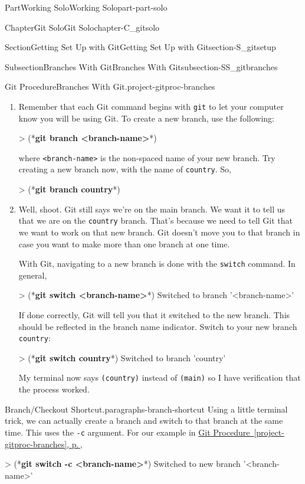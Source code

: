 \documentclass[twoside,10pt,]{book}
\newcommand{\xreffont}{\relax}
\newcommand{\mono}[1]{\texttt{#1}}
\newcommand{\consoleinput}[1]{\textbf{#1}}
\begin{document}
\begin{partptx}{Part}{Working Solo}{}{Working Solo}{}{}{part-part-solo}
\begin{chapterptx}{Chapter}{Git Solo}{}{Git Solo}{}{}{chapter-C_gitsolo}
\begin{sectionptx}{Section}{Getting Set Up with Git}{}{Getting Set Up with Git}{}{}{section-S_gitsetup}
\begin{subsectionptx}{Subsection}{Branches With Git}{}{Branches With Git}{}{}{subsection-SS_gitbranches}
\begin{project}{Git Procedure}{Branches With Git.}{project-gitproc-branches}
\begin{enumerate}[font=\bfseries,label=(\alph*),ref=\alph*]
\item{}Remember that each Git command begins with \mono{git} to let your computer know you will be using Git. To create a new branch, use the following:%
\begin{console}{0}{1}{0}
> (*\consoleinput{git branch <branch-name>}*)
\end{console}
where \mono{<branch-name>} is the non-spaced name of your new branch. Try creating a new branch now, with the name of \mono{country}. So,%
\begin{console}{0}{1}{0}
> (*\consoleinput{git branch country}*)
\end{console}
\item{}Well, shoot. Git still says we're on the main branch. We want it to tell us that we are on the \mono{country} branch. That's because we need to tell Git that we want to work on that new branch. Git doesn't move you to that branch in case you want to make more than one branch at one time.%
\par
With Git, navigating to a new branch is done with the \mono{switch} command. In general,%
\begin{console}{0}{1}{0}
> (*\consoleinput{git switch <branch-name>}*)
Switched to branch '<branch-name>'
\end{console}
If done correctly, Git will tell you that it switched to the new branch. This should be reflected in the branch name indicator. Switch to your new branch \mono{country}:%
\begin{console}{0}{1}{0}
> (*\consoleinput{git switch country}*)
Switched to branch 'country'
\end{console}
My terminal now says \mono{(country)} instead of \mono{(main)} so I have verification that the process worked.%
\end{enumerate}%
\end{project}%
\begin{paragraphs}{Branch\slash{}Checkout Shortcut.}{paragraphs-branch-shortcut}%
Using a little terminal trick, we can actually create a branch and switch to that branch at the same time. This uses the \mono{-c} argument. For our example in \hyperref[project-gitproc-branches]{Git Procedure~{\xreffont\ref{project-gitproc-branches}}, p.\,\pageref{project-gitproc-branches}},%
\begin{console}{0}{1}{0}
> (*\consoleinput{git switch -c <branch-name>}*)
Switched to new branch '<branch-name>'
\end{console}

\end{paragraphs}
\end{subsectionptx}
\end{sectionptx}
\end{chapterptx}
\end{partptx}
\end{document}
